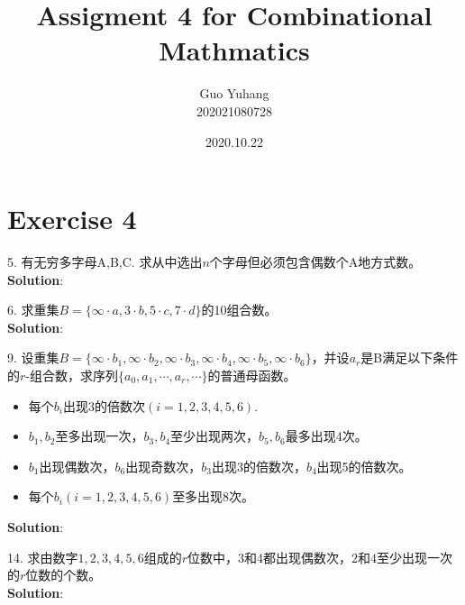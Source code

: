 \documentclass[a4paper]{ctexart}
\title{\textbf{Assigment 4 for Combinational Mathmatics}}
\date{2020.10.22}
\author{Guo Yuhang \\ 202021080728
}
\begin{document}
\maketitle
\section*{Exercise 4}
5. 有无穷多字母A,B,C. 求从中选出$n$个字母但必须包含偶数个A地方式数。\\
\textbf{Solution}: 

6. 求重集$B=\{\infty \cdot a,3\cdot b,5\cdot c,7\cdot d\}$的10组合数。\\
\textbf{Solution}: 

9. 设重集$B=\{\infty \cdot b_1,\infty \cdot b_2,\infty \cdot b_3,\infty \cdot b_4,\infty \cdot b_5,\infty \cdot b_6\}$，并设$a_r$是B满足以下条件的$r$-组合数，求序列$\{a_0,a_1,\cdots,a_r,\cdots\}$的普通母函数。
\begin{itemize}
\item 每个$b_i$出现3的倍数次$(i=1,2,3,4,5,6)$.
\item $b_1,b_2$至多出现一次，$b_3,b_4$至少出现两次，$b_5,b_6$最多出现4次。
\item $b_1$出现偶数次，$b_6$出现奇数次，$b_3$出现3的倍数次，$b_4$出现5的倍数次。
\item 每个$b_i(i=1,2,3,4,5,6)$至多出现8次。
\end{itemize}
\textbf{Solution}:

14. 求由数字$1,2,3,4,5,6$组成的$r$位数中，$3$和$4$都出现偶数次，$2$和$4$至少出现一次的$r$位数的个数。\\
\textbf{Solution}: 
\end{document}
